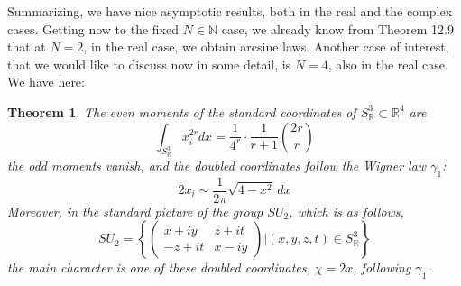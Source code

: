 \documentclass[12pt]{amsbook}
\newtheorem{theorem}{Theorem}[chapter]
\begin{document}
Summarizing, we have nice asymptotic results, both in the real and the complex cases. Getting now to the fixed $N\in\mathbb N$ case, we already know from Theorem 12.9 that at $N=2$, in the real case, we obtain arcsine laws. Another case of interest, that we would like to discuss now in some detail, is $N=4$, also in the real case. We have here:

\begin{theorem}
The even moments of the standard coordinates of $S^3_\mathbb R\subset\mathbb R^4$ are
$$\int_{S^3_\mathbb R}x_i^{2r}dx=\frac{1}{4^r}\cdot\frac{1}{r+1}\binom{2r}{r}$$
the odd moments vanish, and the doubled coordinates follow the Wigner law $\gamma_1$:
$$2x_i\sim\frac{1}{2\pi}\sqrt{4-x^2}\,dx$$
Moreover, in the standard picture of the group $SU_2$, which is as follows,
$$SU_2=\left\{\begin{pmatrix}x+iy&z+it\\ -z+it&x-iy\end{pmatrix}\Big|(x,y,z,t)\in S^3_\mathbb R\right\}$$ 
the main character is one of these doubled coordinates, $\chi=2x$, following $\gamma_1$.
\end{theorem}
\end{document}
